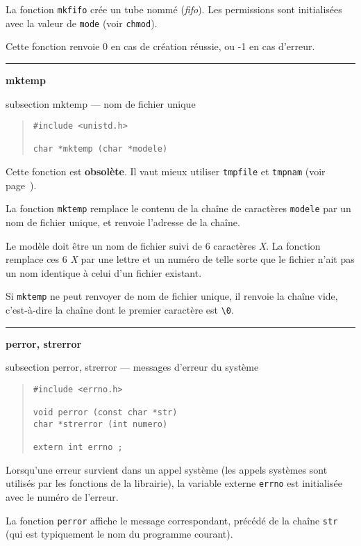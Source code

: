 \documentclass [twoside] {report}
\newcommand {\primitive} [1]
    {
	\phantomsection
	{\large \bf #1}
	\addcontentsline {toc} {subsection} {#1}
    }
\newcommand {\separation}
    {
	\vspace {5mm}
	\nopagebreak
	\hrule
    }
\begin{document}
La fonction {\tt mkfifo} crée un tube nommé ({\em fifo}).
Les permissions sont initialisées avec la valeur de {\tt mode}
(voir {\tt chmod}).

Cette fonction renvoie 0 en cas de création
réussie, ou -1 en cas d'erreur.




\separation 
\primitive {mktemp} --- nom de fichier unique

\begin {quote}
\begin {verbatim}
#include <unistd.h>

char *mktemp (char *modele)
\end{verbatim}
\end {quote}

Cette fonction est \textbf {obsolète}. Il vaut mieux utiliser {\tt tmpfile} et
{\tt tmpnam} (voir page~\pageref {tmpfile}).

La fonction {\tt mktemp} remplace le contenu de la chaîne de
caractères {\tt modele} par un nom de fichier unique, et
renvoie l'adresse de la chaîne.

Le modèle doit être un nom de fichier suivi de 6 caractères
{\it X}. La fonction remplace ces 6 {\it X} par une lettre et un
numéro de telle sorte que le fichier n'ait pas un nom
identique à celui d'un fichier existant.

Si {\tt mktemp} ne peut renvoyer de nom de fichier unique, il
renvoie la chaîne vide, c'est-à-dire la chaîne dont le
premier caractère est \verb:\0:.




\separation 
\primitive {perror, strerror} --- messages d'erreur du système

\begin {quote}
\begin {verbatim}
#include <errno.h>

void perror (const char *str)
char *strerror (int numero)

extern int errno ;
\end{verbatim}
\end {quote}

Lorsqu'une erreur survient dans un appel système (les
appels systèmes sont utilisés par les fonctions de la
librairie), la variable externe {\tt errno} est initialisée avec
le numéro de l'erreur.

La fonction {\tt perror} affiche le message correspondant,
précédé de la chaîne {\tt str} (qui est typiquement le nom du programme
courant).
\end{document}
